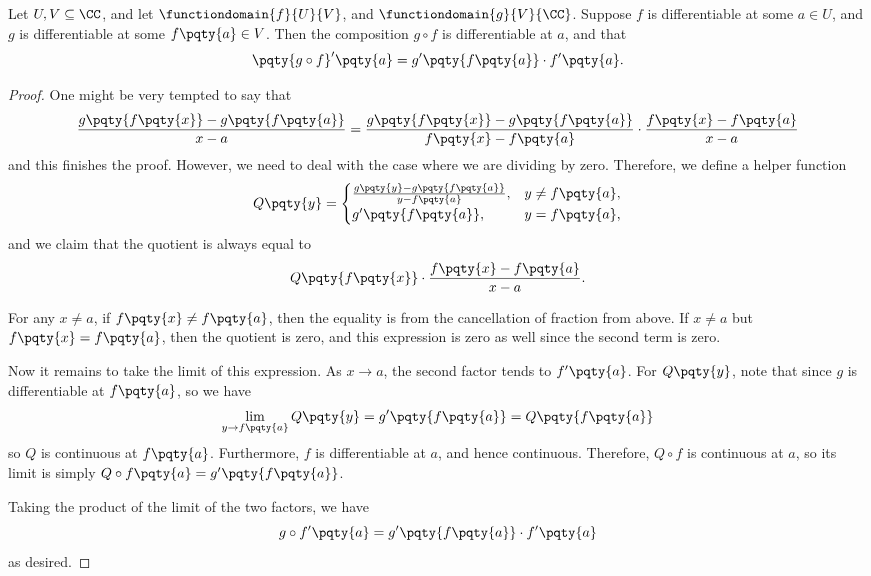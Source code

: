 \begin{proposition}
    \label{prop:chain-rule}%
    Let \(U, V \subseteq \CC\), and let \(\functiondomain{f}{U}{V}\), and \(\functiondomain{g}{V}{\CC}\). Suppose \(f\) is differentiable at some \(a \in U\), and \(g\) is differentiable at some \(f\pqty{a} \in V\). Then the composition \(g \circ f\) is differentiable at \(a\), and that
    \[
        \pqty{g \circ f}'\pqty{a} = g' \pqty{f\pqty{a}} \cdot f'\pqty{a}.
    \]
\end{proposition}

\begin{proof}
    One might be very tempted to say that
    \[
        \frac{g\pqty{f\pqty{x}} - g\pqty{f\pqty{a}}}{x - a} = \frac{g\pqty{f\pqty{x}} - g\pqty{f\pqty{a}}}{f\pqty{x} - f\pqty{a}} \cdot \frac{f\pqty{x} - f\pqty{a}}{x - a}
    \]
    and this finishes the proof. However, we need to deal with the case where we are dividing by zero. Therefore, we define a helper function
    \[
        Q\pqty{y} = \begin{cases}
            \frac{g\pqty{y} - g\pqty{f\pqty{a}}}{y - f\pqty{a}}, & y \neq f\pqty{a}, \\
            g'\pqty{f\pqty{a}}, & y = f\pqty{a},
        \end{cases}
    \]
    and we claim that the quotient is always equal to
    \[
        Q\pqty{f\pqty{x}} \cdot \frac{f\pqty{x} - f\pqty{a}}{x - a}.
    \]

    For any \(x \neq a\), if \(f\pqty{x} \neq f\pqty{a}\), then the equality is from the cancellation of fraction from above. If \(x \neq a\) but \(f\pqty{x} = f\pqty{a}\), then the quotient is zero, and this expression is zero as well since the second term is zero.

    Now it remains to take the limit of this expression. As \(x \to a\), the second factor tends to \(f'\pqty{a}\). For \(Q\pqty{y}\), note that since \(g\) is differentiable at \(f\pqty{a}\), so we have
    \[
        \lim_{y \to f\pqty{a}} Q\pqty{y} = g'\pqty{f\pqty{a}} = Q\pqty{f\pqty{a}}
    \]
    so \(Q\) is continuous at \(f\pqty{a}\). Furthermore, \(f\) is differentiable at \(a\), and hence continuous. Therefore, \(Q \circ f\) is continuous at \(a\), so its limit is simply \(Q\circ f\pqty{a} = g'\pqty{f\pqty{a}}\).

    Taking the product of the limit of the two factors, we have
    \[
        g \circ f'\pqty{a} = g'\pqty{f\pqty{a}} \cdot f'\pqty{a}
    \]
    as desired.
\end{proof}

